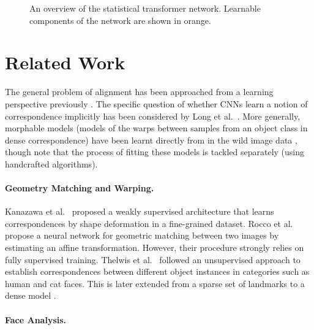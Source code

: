 \documentclass[runningheads]{llncs}
\newcommand{\etal}{{et al.~}}
\begin{document}
\begin{figure}[t]
\noindent{}
\caption{An overview of the statistical transformer network. Learnable components of the network are shown in orange. }
\label{fig:example}
\end{figure}

\section{Related Work}

The general problem of alignment has been approached from a learning perspective previously \cite{huang2012learning}. The specific question of whether CNNs learn a notion of correspondence implicitly has been considered by Long \etal \cite{long2014convnets}. More generally, morphable models (models of the warps between samples from an object class in dense correspondence) have been learnt directly from in the wild image data \cite{cashman2013shape,antonakos2014automatic}, though note that the process of fitting these models is tackled separately (using handcrafted algorithms).


\paragraph{Geometry Matching and Warping.}

Kanazawa \etal \cite{kanazawa2016warpnet} proposed a weakly supervised architecture that learns correspondences by shape deformation in a fine-grained dataset. Rocco \etal \cite{rocco2017convolutional} propose a neural network for geometric matching between two images by estimating an affine transformation. However, their procedure strongly relies on fully supervised training. Thelwis \etal \cite{thewlis2017unsupervised} followed an unsupervised approach to establish correspondences between different object instances in categories such as human and cat faces. This is later extended from a sparse set of landmarks to a dense model \cite{thewlis2017unsupervised2}.



\paragraph{Face Analysis.}
\end{document}
